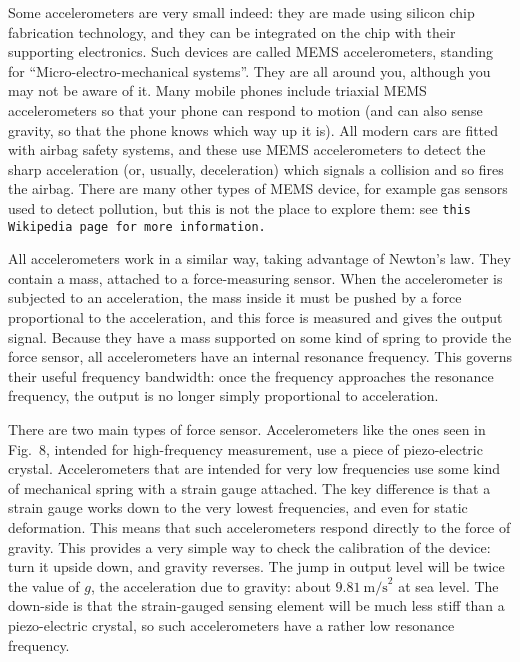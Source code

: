 
  Some accelerometers are very small indeed: they are made using silicon chip 
  fabrication technology, and they can be integrated on the chip with their 
  supporting electronics. Such devices are called MEMS accelerometers, standing 
  for “Micro-electro-mechanical systems”. They are all around you, although you 
  may not be aware of it. Many mobile phones include triaxial MEMS 
  accelerometers so that your phone can respond to motion (and can also sense 
  gravity, so that the phone knows which way up it is). All modern cars are 
  fitted with airbag safety systems, and these use MEMS accelerometers to 
  detect the sharp acceleration (or, usually, deceleration) which signals a 
  collision and so fires the airbag. There are many other types of MEMS device, 
  for example gas sensors used to detect pollution, but this is not the place 
  to explore them: see \tt{}this Wikipedia page\rm{} for more information. 

  All accelerometers work in a similar way, taking advantage of Newton’s law. 
  They contain a mass, attached to a force-measuring sensor. When the 
  accelerometer is subjected to an acceleration, the mass inside it must be 
  pushed by a force proportional to the acceleration, and this force is 
  measured and gives the output signal. Because they have a mass supported on 
  some kind of spring to provide the force sensor, all accelerometers have an 
  internal resonance frequency. This governs their useful frequency bandwidth: 
  once the frequency approaches the resonance frequency, the output is no 
  longer simply proportional to acceleration. 

  There are two main types of force sensor. Accelerometers like the ones seen 
  in Fig.\ 8, intended for high-frequency measurement, use a piece of 
  piezo-electric crystal. Accelerometers that are intended for very low 
  frequencies use some kind of mechanical spring with a strain gauge attached. 
  The key difference is that a strain gauge works down to the very lowest 
  frequencies, and even for static deformation. This means that such 
  accelerometers respond directly to the force of gravity. This provides a very 
  simple way to check the calibration of the device: turn it upside down, and 
  gravity reverses. The jump in output level will be twice the value of $g$, 
  the acceleration due to gravity: about $9.81\mathrm{~m/s}^2$ at sea level. 
  The down-side is that the strain-gauged sensing element will be much less 
  stiff than a piezo-electric crystal, so such accelerometers have a rather low 
  resonance frequency. 

